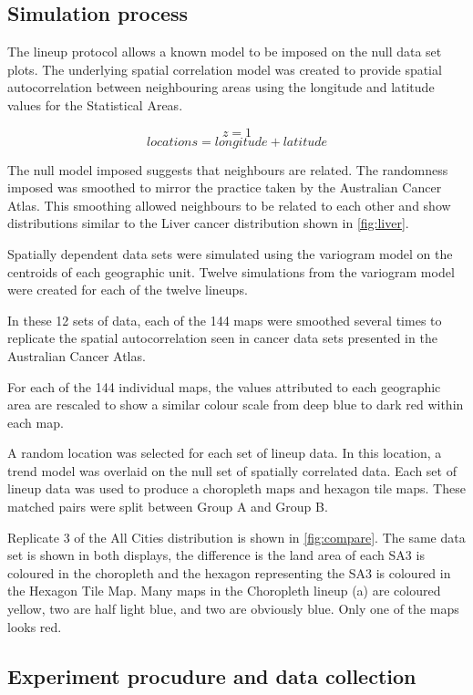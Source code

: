 \documentclass[conference,final,]{IEEEtran}
\begin{document}
\hypertarget{simulation-process}{%
\subsection{Simulation process}\label{simulation-process}}

The lineup protocol allows a known model to be imposed on the null data
set plots. The underlying spatial correlation model was created to
provide spatial autocorrelation between neighbouring areas using the
longitude and latitude values for the Statistical Areas.

\[z = 1\] \[locations = longitude + latitude\]

The null model imposed suggests that neighbours are related. The
randomness imposed was smoothed to mirror the practice taken by the
Australian Cancer Atlas. This smoothing allowed neighbours to be related
to each other and show distributions similar to the Liver cancer
distribution shown in \ref{fig:liver}.

Spatially dependent data sets were simulated using the variogram model
on the centroids of each geographic unit. Twelve simulations from the
variogram model were created for each of the twelve lineups.

In these 12 sets of data, each of the 144 maps were smoothed several
times to replicate the spatial autocorrelation seen in cancer data sets
presented in the Australian Cancer Atlas.

For each of the 144 individual maps, the values attributed to each
geographic area are rescaled to show a similar colour scale from deep
blue to dark red within each map.

A random location was selected for each set of lineup data. In this
location, a trend model was overlaid on the null set of spatially
correlated data. Each set of lineup data was used to produce a
choropleth maps and hexagon tile maps. These matched pairs were split
between Group A and Group B.

Replicate 3 of the All Cities distribution is shown in
\ref{fig:compare}. The same data set is shown in both displays, the
difference is the land area of each SA3 is coloured in the choropleth
and the hexagon representing the SA3 is coloured in the Hexagon Tile
Map. Many maps in the Choropleth lineup (a) are coloured yellow, two are
half light blue, and two are obviously blue. Only one of the maps looks
red.

\hypertarget{experiment-procudure-and-data-collection}{%
\subsection{Experiment procudure and data
collection}\label{experiment-procudure-and-data-collection}}
\end{document}
